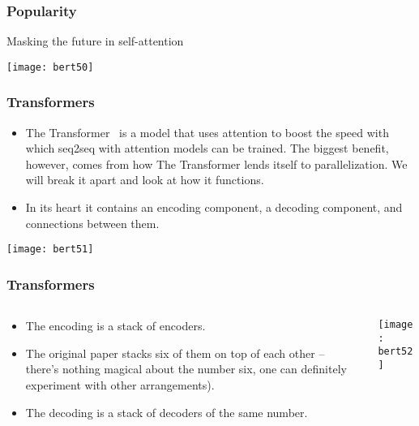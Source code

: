 \begin{frame}[fragile]\frametitle{Popularity}

Masking the future in self-attention

\begin{center}
\texttt{[image: bert50]}
\end{center}	

 
\end{frame}


\begin{frame}[fragile]\frametitle{Transformers}


\begin{itemize}
\item The Transformer  is a model that uses attention to boost the speed with which seq2seq with attention models can be trained. The biggest benefit, however, comes from how The Transformer lends itself to parallelization. We will break it apart and look at how it functions.
\item In its heart it contains an encoding component, a decoding component, and connections between them.
\end{itemize}	 

\begin{center}
\texttt{[image: bert51]}
\end{center}	

\end{frame}


\begin{frame}[fragile]\frametitle{Transformers}
\begin{columns}
    \begin{column}[T]{0.5\linewidth}
      \begin{itemize}
			\item The encoding is a stack of encoders.
			\item The original paper stacks six of them on top of each other – there’s nothing magical about the number six, one can definitely experiment with other arrangements). 
			\item The decoding is a stack of decoders of the same number.
			\end{itemize}
		\end{column}
    \begin{column}[T]{0.5\linewidth}
		
			\begin{center}
			\texttt{[image: bert52]}
			\end{center}

    \end{column}
  \end{columns}
\end{frame}


